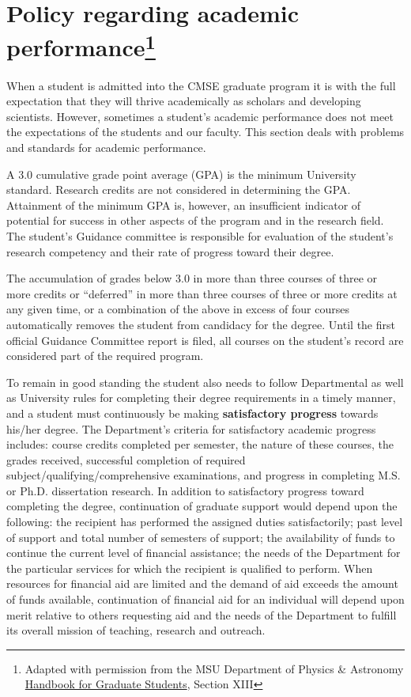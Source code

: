 \section[Policy regarding academic performance]{Policy regarding
  academic performance\footnote{Adapted with permission from the MSU
    Department of Physics \& Astronomy
    \href{https://www.pa.msu.edu/grad/GradHandbook_Aug2015.pdf}{Handbook
      for Graduate
      Students}, Section XIII}}

When a student is admitted into the CMSE graduate program it is with
the full expectation that they will thrive academically as scholars
and developing scientists. However, sometimes a student's academic
performance does not meet the expectations of the students and our
faculty.  This section deals with problems and standards for academic
performance.

A 3.0 cumulative grade point average (GPA) is the minimum University
standard. Research credits are not considered in determining the
GPA. Attainment of the minimum GPA is, however, an insufficient
indicator of potential for success in other aspects of the program and
in the research field. The student's Guidance committee is responsible
for evaluation of the student's research competency and their rate of
progress toward their degree. 

The accumulation of grades below 3.0 in more than three courses of
three or more credits or ``deferred'' in more than three courses of
three or more credits at any given time, or a combination of the above
in excess of four courses automatically removes the student from
candidacy for the degree. Until the first official Guidance Committee
report is filed, all courses on the student's record are considered
part of the required program.

To remain in good standing the student also needs to follow
Departmental as well as University rules for completing their degree
requirements in a timely manner, and a student must continuously be
making \textbf{satisfactory progress} towards his/her degree.  The
Department's criteria for satisfactory academic progress includes:
course credits completed per semester, the nature of these courses,
the grades received, successful completion of required
subject/qualifying/comprehensive examinations, and progress in
completing M.S. or Ph.D. dissertation research. In addition to
satisfactory progress toward completing the degree, continuation of
graduate support would depend upon the following: the recipient has
performed the assigned duties satisfactorily; past level of support
and total number of semesters of support; the availability of funds to
continue the current level of financial assistance; the needs of the
Department for the particular services for which the recipient is
qualified to perform.  When resources for financial aid are limited
and the demand of aid exceeds the amount of funds available,
continuation of financial aid for an individual will depend upon merit
relative to others requesting aid and the needs of the Department to
fulfill its overall mission of teaching, research and outreach.  
 

